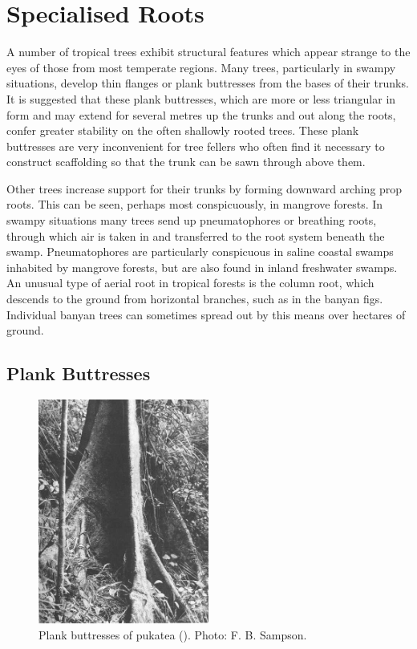 \section{Specialised Roots}

A number of tropical trees exhibit structural features which appear strange to the eyes of those from most temperate regions.
Many trees, particularly in swampy situations, develop thin flanges or plank buttresses from the bases of their trunks.
It is suggested that these plank buttresses, which are more or less triangular in form and may extend for several metres up the trunks and out along the roots, confer greater stability on the often shallowly rooted trees.
These plank buttresses are very inconvenient for tree fellers who often find it necessary to construct scaffolding so that the trunk can be sawn through above them.

Other trees increase support for their trunks by forming downward arching prop roots.
This can be seen, perhaps most conspicuously, in mangrove forests.
In swampy situations many trees send up pneumatophores or breathing roots, through which air is taken in and transferred to the root system beneath the swamp.
Pneumatophores are particularly conspicuous in saline coastal swamps inhabited by mangrove forests, but are also found in inland freshwater swamps.
An unusual type of aerial root in tropical forests is the column root, which descends to the ground from horizontal branches, such as in the banyan figs.
Individual banyan trees can sometimes spread out by this means over hectares of ground.

\subsection{Plank Buttresses}

\begin{figure}
	\includegraphics[width=0.5\textwidth]{graphics/figure9buttresses.jpg}
	\centering
	\caption[Plank buttresses of pukatea]{Plank buttresses of pukatea ().
	Photo:  F. B. Sampson.}%
	\label{fig:9buttresses}
\end{figure}

